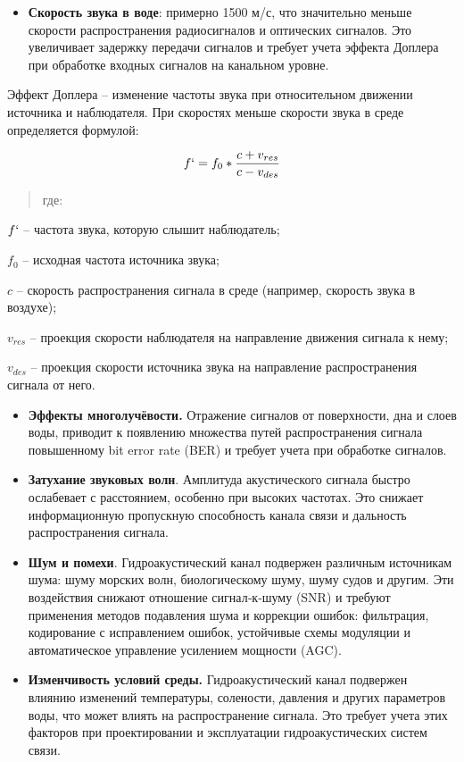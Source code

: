 \begin{itemize}
\item
  \textbf{Скорость звука в воде}: примерно 1500 м/с, что значительно
  меньше скорости распространения радиосигналов и оптических сигналов.
  Это увеличивает задержку передачи сигналов и требует учета эффекта
  Доплера при обработке входных сигналов на канальном уровне.
\end{itemize}

Эффект Доплера -- изменение частоты звука при относительном движении
источника и наблюдателя. При скоростях меньше скорости звука в среде
определяется формулой:

\[f` = f_{0}*\frac{c + v_{res}}{c - v_{des}}\]

\begin{quote}
где:
\end{quote}

\(f`\) -- частота звука, которую слышит наблюдатель;

\(f_{0}\) -- исходная частота источника звука;

\(c\) -- скорость распространения сигнала в среде (например, скорость
звука в воздухе);

\(v_{res}\) -- проекция скорости наблюдателя на направление движения
сигнала к нему;

\(v_{des}\) -- проекция скорости источника звука на направление
распространения сигнала от него.

\begin{itemize}
\item
  \textbf{Эффекты многолучёвости.} Отражение сигналов от поверхности,
  дна и слоев воды, приводит к появлению множества путей распространения
  сигнала повышенному bit error rate (BER) и требует учета при обработке
  сигналов.
\item
  \textbf{Затухание звуковых волн}. Амплитуда акустического сигнала
  быстро ослабевает с расстоянием, особенно при высоких частотах. Это
  снижает информационную пропускную способность канала связи и дальность
  распространения сигнала.
\item
  \textbf{Шум и помехи}. Гидроакустический канал подвержен различным
  источникам шума: шуму морских волн, биологическому шуму, шуму судов и
  другим. Эти воздействия снижают отношение сигнал‑к‑шуму (SNR) и
  требуют применения методов подавления шума и коррекции ошибок:
  фильтрация, кодирование с исправлением ошибок, устойчивые схемы
  модуляции и автоматическое управление усилением мощности (AGC).
\item
  \textbf{Изменчивость условий среды.} Гидроакустический канал подвержен
  влиянию изменений температуры, солености, давления и других параметров
  воды, что может влиять на распространение сигнала. Это требует учета
  этих факторов при проектировании и эксплуатации гидроакустических
  систем связи.
\end{itemize}


